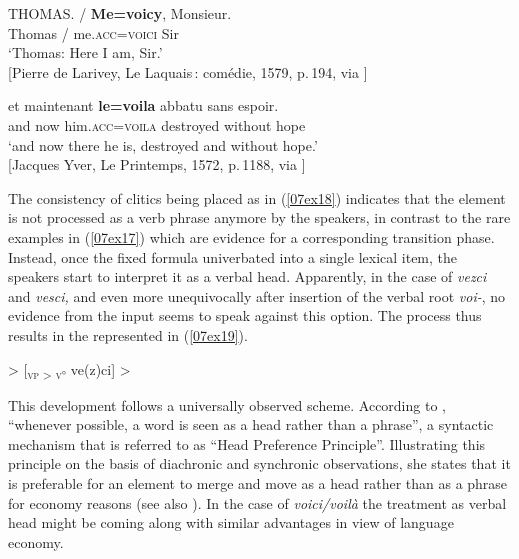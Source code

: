\documentclass[output=paper,colorlinks,citecolor=brown]{langscibook}
\begin{document}
\begin{exe}
	\ex \label{07ex18}
	\begin{xlist}
		\ex \gll THOMAS. / \textbf{Me=voicy}, Monsieur. \\
		Thomas / me.\textsc{acc=voici} Sir \\
		\trans ‘Thomas: Here I am, Sir.’ \\
		\hfill [Pierre de Larivey, Le Laquais : comédie, 1579, p. 194, via \citeauthor{frantext}]
		
		\ex \gll et maintenant \textbf{le=voila} abbatu sans espoir. \\
		and now him.\textsc{acc=voila} destroyed without hope \\
		\trans ‘and now there he is, destroyed and without hope.’ \\
		\hfill [Jacques Yver, Le Printemps, 1572, p. 1188, via \citeauthor{frantext}]
	\end{xlist}
\end{exe}

The consistency of clitics being placed as in (\ref{07ex18}) indicates that the  element is not processed as a verb phrase anymore by the speakers, in contrast to the rare examples in (\ref{07ex17}) which are evidence for a corresponding transition phase. Instead, once the fixed formula univerbated into a single lexical item, the speakers start to interpret it as a verbal head. Apparently, in the case of \emph{vezci} and \emph{vesci,} and even more unequivocally after insertion of the verbal root \emph{voi-}, no evidence from the input seems to speak against this option. The process thus results in the  represented in (\ref{07ex19}).

\begin{exe}
	\ex \label{07ex19}
	 >
		[\textsubscript{\textsc{vp > v°}} ve(z)ci] >
\end{exe}

{\sloppy This development follows a universally observed scheme. According to \citet[13]{vangelderen2011}, ``whenever possible, a word is seen as a head rather than a phrase'', a syntactic mechanism that is referred to as ``Head Preference Principle''. Illustrating this principle on the basis of diachronic and synchronic observations, she states that it is preferable for an element to merge and move as a head rather than as a phrase for economy reasons (see also \citealt{vangelderen2004}). In the case of \emph{voici/voilà} the treatment as verbal head might be coming along with similar advantages in view of language economy.\par}
\end{document}
